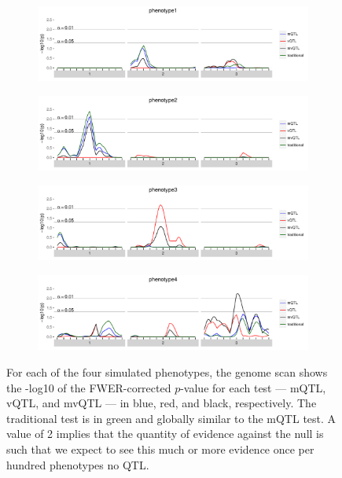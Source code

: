 \documentclass[9pt,twocolumn,twoside]{gsag3jnl}
\begin{document}
\begin{figure}[t]
    \begin{subfigure}[b]{\linewidth}
        \includegraphics[width=\textwidth]{images/empir_p_scan_phenotype1.pdf}
    \end{subfigure}

    \begin{subfigure}[b]{\linewidth}
        \includegraphics[width=\textwidth]{images/empir_p_scan_phenotype2.pdf}
    \end{subfigure}

    \begin{subfigure}[b]{\linewidth}
        \includegraphics[width=\textwidth]{images/empir_p_scan_phenotype3.pdf}
    \end{subfigure}

    \begin{subfigure}[b]{\linewidth}
        \includegraphics[width=\textwidth]{images/empir_p_scan_phenotype4.pdf}
    \end{subfigure}

    \caption{
        For each of the four simulated phenotypes, the genome scan shows the -log10 of the FWER-corrected $p$-value for each test --- mQTL, vQTL, and mvQTL --- in blue, red, and black, respectively.
        The traditional test is in green and globally similar to the mQTL test.
        A value of 2 implies that the quantity of evidence against the null is such that we expect to see this much or more evidence once per hundred phenotypes no QTL.
    }
    \label{fig:empir_p_scans}
\end{figure}
\end{document}
